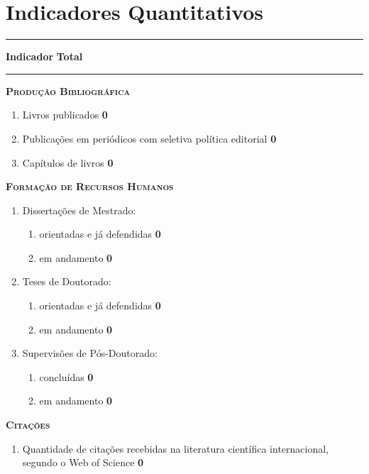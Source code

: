 \newpage
\section{Indicadores Quantitativos}
\newcommand{\indrow}[2]{\item #1 \hfill \textbf{#2}}

\noindent\rule{\textwidth}{1.25pt}\par	%
\vspace{0em}
\noindent\textbf{Indicador} \hfill \textbf{Total}\par
\vspace{-0.4em}
\noindent\rule{\textwidth}{0.75pt}\par	%
\vspace{0.7em}

\noindent\textsc{\bfseries Produção Bibliográfica}
\begin{enumerate}[label=\arabic*), leftmargin=2em]
    \indrow{Livros publicados}{0}
    \indrow{Publicações em periódicos com seletiva política editorial}{0}
    \indrow{Capítulos de livros}{0}
\end{enumerate}

\vspace{1em}
\noindent\textsc{\bfseries Formação de Recursos Humanos}
\begin{enumerate}[resume, label=\arabic*), leftmargin=2em]
    \item Dissertações de Mestrado:
    \begin{enumerate}[label=\arabic{enumi}.\alph*), leftmargin=1.5em]
        \indrow{orientadas e já defendidas}{0}
        \indrow{em andamento}{0}
    \end{enumerate}
    \item Teses de Doutorado:
    \begin{enumerate}[label=\arabic{enumi}.\alph*), leftmargin=1.5em]
        \indrow{orientadas e já defendidas}{0}
        \indrow{em andamento}{0}
    \end{enumerate}
    \item Supervisões de Pós-Doutorado:
    \begin{enumerate}[label=\arabic{enumi}.\alph*), leftmargin=1.5em]
        \indrow{concluídas}{0}
        \indrow{em andamento}{0}
    \end{enumerate}
\end{enumerate}

\vspace{1em}
\noindent\textsc{\bfseries Citações}
\begin{enumerate}[resume, label=\arabic*), leftmargin=2em]
    \indrow{Quantidade de citações recebidas na literatura científica internacional, segundo o Web of Science}{0}
\end{enumerate}

